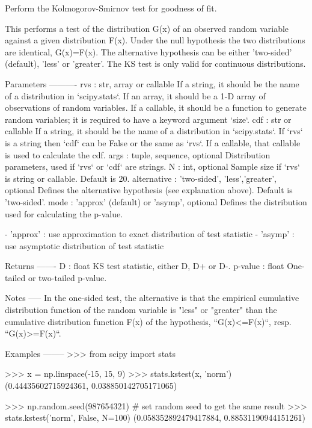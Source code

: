 \begin{DoxyVerb}Perform the Kolmogorov-Smirnov test for goodness of fit.

This performs a test of the distribution G(x) of an observed
random variable against a given distribution F(x). Under the null
hypothesis the two distributions are identical, G(x)=F(x). The
alternative hypothesis can be either 'two-sided' (default), 'less'
or 'greater'. The KS test is only valid for continuous distributions.

Parameters
----------
rvs : str, array or callable
    If a string, it should be the name of a distribution in `scipy.stats`.
    If an array, it should be a 1-D array of observations of random
    variables.
    If a callable, it should be a function to generate random variables;
    it is required to have a keyword argument `size`.
cdf : str or callable
    If a string, it should be the name of a distribution in `scipy.stats`.
    If `rvs` is a string then `cdf` can be False or the same as `rvs`.
    If a callable, that callable is used to calculate the cdf.
args : tuple, sequence, optional
    Distribution parameters, used if `rvs` or `cdf` are strings.
N : int, optional
    Sample size if `rvs` is string or callable.  Default is 20.
alternative : {'two-sided', 'less','greater'}, optional
    Defines the alternative hypothesis (see explanation above).
    Default is 'two-sided'.
mode : 'approx' (default) or 'asymp', optional
    Defines the distribution used for calculating the p-value.

      - 'approx' : use approximation to exact distribution of test statistic
      - 'asymp' : use asymptotic distribution of test statistic

Returns
-------
D : float
    KS test statistic, either D, D+ or D-.
p-value :  float
    One-tailed or two-tailed p-value.

Notes
-----
In the one-sided test, the alternative is that the empirical
cumulative distribution function of the random variable is "less"
or "greater" than the cumulative distribution function F(x) of the
hypothesis, ``G(x)<=F(x)``, resp. ``G(x)>=F(x)``.

Examples
--------
>>> from scipy import stats

>>> x = np.linspace(-15, 15, 9)
>>> stats.kstest(x, 'norm')
(0.44435602715924361, 0.038850142705171065)

>>> np.random.seed(987654321) # set random seed to get the same result
>>> stats.kstest('norm', False, N=100)
(0.058352892479417884, 0.88531190944151261)


\end{DoxyVerb}
